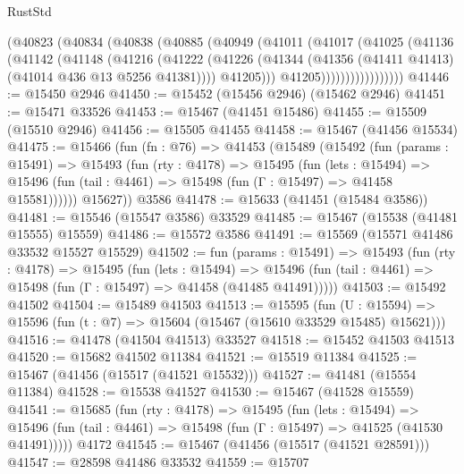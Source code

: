 \begin{lexlean}{RustStd}
\begin{coremodule}
                  (@40823
                    (@40834
                      (@40838
                        (@40885
                          (@40949
                            (@41011
                              (@41017
                                (@41025
                                  (@41136
                                    (@41142
                                      (@41148
                                        (@41216
                                          (@41222
                                            (@41226
                                              (@41344
                                                (@41356
                                                  (@41411 @41413)
                                                  (@41014 @436 @13 @5256 @41381))))
                                            @41205)))
                                      @41205)))))))))))))))))
@41446 := @15450 @2946
@41450 := @15452 (@15456 @2946) (@15462 @2946)
@41451 := @15471 @33526
@41453 := @15467 (@41451 @15486)
@41455 := @15509 (@15510 @2946)
@41456 := @15505 @41455
@41458 := @15467 (@41456 @15534)
@41475 := @15466
    (fun (fn : @76) =>
    @41453
      (@15489
        (@15492
          (fun (params : @15491) =>
          @15493
            (fun (rty : @4178) =>
            @15495
              (fun (lets : @15494) =>
              @15496 (fun (tail : @4461) => @15498 (fun (Γ : @15497) => @41458 @15581))))))
        @15627))
    @3586
@41478 := @15633 (@41451 (@15484 @3586))
@41481 := @15546 (@15547 @3586) @33529
@41485 := @15467 (@15538 (@41481 @15555) @15559)
@41486 := @15572 @3586
@41491 := @15569 (@15571 @41486 @33532 @15527 @15529)
@41502 := fun (params : @15491) =>
  @15493
    (fun (rty : @4178) =>
    @15495
      (fun (lets : @15494) =>
      @15496 (fun (tail : @4461) => @15498 (fun (Γ : @15497) => @41458 (@41485 @41491)))))
@41503 := @15492 @41502
@41504 := @15489 @41503
@41513 := @15595
    (fun (U : @15594) => @15596 (fun (t : @7) => @15604 (@15467 (@15610 @33529 @15485) @15621)))
@41516 := @41478 (@41504 @41513) @33527
@41518 := @15452 @41503 @41513
@41520 := @15682 @41502 @11384
@41521 := @15519 @11384
@41525 := @15467 (@41456 (@15517 (@41521 @15532)))
@41527 := @41481 (@15554 @11384)
@41528 := @15538 @41527
@41530 := @15467 (@41528 @15559)
@41541 := @15685
    (fun (rty : @4178) =>
    @15495
      (fun (lets : @15494) =>
      @15496 (fun (tail : @4461) => @15498 (fun (Γ : @15497) => @41525 (@41530 @41491)))))
    @4172
@41545 := @15467 (@41456 (@15517 (@41521 @28591)))
@41547 := @28598 @41486 @33532
@41559 := @15707

\end{coremodule}
\end{lexlean}
